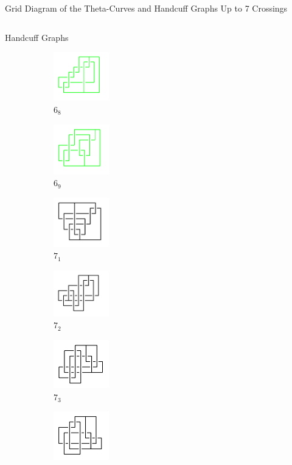 \documentclass[final]{beamer}
\begin{document}
\begin{frame}[t]
\begin{alertblock}{Grid Diagram of the Theta-Curves and Handcuff Graphs Up to 7 Crossings}
\begin{columns}[t]
\begin{column}{0.3\textwidth}
\begin{alertblock}{Handcuff Graphs}
\begin{figure}
    \begin{subfigure}{0.15\textwidth}
    \includegraphics[width=2.4cm]{../Midterm_Poster/grid_diagram/handcuff_6_8.png}
    \caption{$6_{8}$} 
    \end{subfigure}
    \begin{subfigure}{0.15\textwidth}
    \includegraphics[width=2.4cm]{../Midterm_Poster/grid_diagram/handcuff_6_9.png}
    \caption{$6_{9}$} 
    \end{subfigure}
    \begin{subfigure}{0.15\textwidth}
    \includegraphics[width=2.4cm]{../Midterm_Poster/grid_diagram/handcuff_7_1.png}
    \caption{$7_{1}$} 
    \end{subfigure}
    \begin{subfigure}{0.15\textwidth}
    \includegraphics[width=2.4cm]{../Midterm_Poster/grid_diagram/handcuff_7_2.png}
    \caption{$7_{2}$} 
    \end{subfigure}
    \begin{subfigure}{0.15\textwidth}
    \includegraphics[width=2.4cm]{../Midterm_Poster/grid_diagram/handcuff_7_3.png}
    \caption{$7_{3}$} 
    \end{subfigure}
    \begin{subfigure}{0.15\textwidth}
    \includegraphics[width=2.4cm]{../Midterm_Poster/grid_diagram/handcuff_7_4.png}

\end{subfigure}
\end{figure}
\end{alertblock}
\end{column}
\end{columns}
\end{alertblock}
\end{frame}
\end{document}
